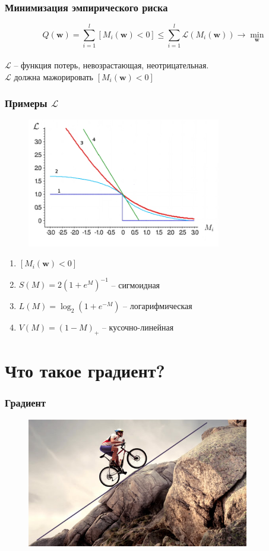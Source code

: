 \documentclass[10pt]{beamer}
\begin{document}
{
\begin{frame}\frametitle{Минимизация эмпирического риска}
	$${Q(\mathbf{w}) = \sum\limits_{i=1}^l \left[ M_i(\mathbf{w}) < 0 \right] \leq \sum\limits_{i=1}^l \mathcal{L}(M_i(\mathbf{w})) \rightarrow \min\limits_{\mathbf{w}} }$$\\
	\bigbreak
	$\mathcal{L}$ -- функция потерь, невозрастающая, неотрицательная.\\
	$\mathcal{L}$ должна мажорировать $\left[M_i(\mathbf{w}) < 0 \right]$
\end{frame}
}

\begin{frame}\frametitle{Примеры $\mathcal{L}$}
	\begin{figure}[htbp]
	  \includegraphics[height=160pt, keepaspectratio = true]{images/l}
	\end{figure}

	\begin{enumerate}
		\item $\left[M_i(\mathbf{w}) < 0 \right]$
		\item $S(M) = 2(1+e^M)^{-1}$ -- сигмоидная
		\item $L(M) = \log_2(1+e^{-M})$ -- логарифмическая
		\item $V(M) = (1-M)_+$ -- кусочно-линейная
	\end{enumerate}
\end{frame}

\section{Что такое градиент?}

\begin{frame}\frametitle{Градиент}
	\begin{figure}[htbp]
	  \includegraphics[height=160pt, keepaspectratio = true]{images/gradient}
	\end{figure}
\end{frame}
\end{document}
